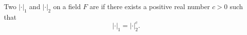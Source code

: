 \begin{definition} \label{definition:equivalent_absolute_values_on_a_field}
Two  $|\cdot|_1$ and $|\cdot|_2$ on a field $F$ are  if there exists a positive real number $c > 0$ such that
\[
|\cdot|_1 = |\cdot|_2^c.
\]
\end{definition}
